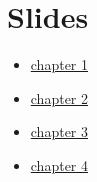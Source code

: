 \documentclass[]{book}
\providecommand{\tightlist}{%
  \setlength{\itemsep}{0pt}\setlength{\parskip}{0pt}}
\theoremstyle{definition}
\theoremstyle{definition}
\theoremstyle{definition}
\theoremstyle{remark}
\begin{document}
\chapter{Slides}\label{slides}

\begin{itemize}
\tightlist
\item
  \href{http://rpubs.com/floswald/ScPoMetrics-1}{chapter 1}
\item
  \href{http://rpubs.com/floswald/ScPoMetrics-2}{chapter 2}
\item
  \href{http://rpubs.com/floswald/ScPoMetrics-3}{chapter 3}
\item
  \href{slides/chapter4/chapter4.html}{chapter 4}
\end{itemize}


\end{document}

